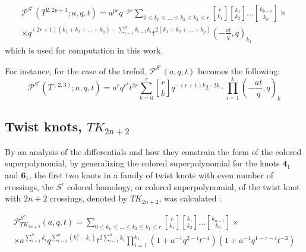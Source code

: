 \documentclass[a4paper,titlepage,twoside]{book}
\begin{document}
\begin{equation}
  \begin{gathered}
    \mathcal{P}^{ S^r}{ (T^{2,2p+1};a,q,t) } = a^{pr} q^{-pr} \sum_{ 0 \leq k_p \leq \dots \leq k_2 \leq k_1 \leq r} { r \brack k_1 } { k_1 \brack k_2 } \dots { k_{p-1} \brack k_p } \times \\
    \times q^{ (2r+1)( k_1 + k_2 + \dots + k_p )  - \sum_{i=1}^p k_{i-1} k_i } t^{ 2 (k_1 + k_2 + \dots + k_p ) } \left( -\frac{at}{q}, q \right)_{k_1}
\end{gathered} \label{Eq:analysisofdtorusknotPr01}
\end{equation}
which is used for computation in this work.  

For instance, for the case of the trefoil, $\mathcal{P}^{S^r}{(a,q,t)}$ becomes the following:
\begin{equation}
\mathcal{P}^{S^r}{ ( T^{(2,3)} ; a , q,t ) } = a^r q^{r^2} t^{2r} \sum_{k=0}^r { r \brack k } q^{ -(r+1)k } t^{-2k } \cdot \prod_{i=1}^k  \left( - \frac{at}{q} , q \right)_k \label{Eq:analysisofdifftrefoil} 
\end{equation}


\subsection{Twist knots, $TK_{2n+2}$}

By an analysis of the differentials and how they constrain the form of the colored superpolynomial, by generalizing the colored superpolynomial for the knots $\mathbf{4}_1$ and $\mathbf{6}_1$, the first two knots in a family of twist knots with even number of crossings, the $S^r$ colored homology, or colored superpolynomial, of the twist knot with $2n+2$ crossings, denoted by $TK_{2n+2}$, was calculated \cite{FujiGukovStosicSulkowski2013}:

\begin{equation}
\begin{gathered}
\mathcal{P}^{ S^r}_{TK_{2n+2} }{ (a,q,t)} = \sum_{ 0 \leq k_n \leq \dots \leq k_2 \leq k_1 \leq r} { r \brack k_1 } { k_1 \brack k_2 } \dots { k_{n-1} \brack k_n } \times \\
\times a^{ \sum_{i=1}^n k_i } q^{ \sum_{i=1}^n (k_i^2- k_i) } t^{ 2 \sum_{i=1}^n k_i } \prod_{i=1}^{k_1} (1 + a^{-1} q^{2-i } t^{-1} )(1 + a^{-1} q^{1-r-i} t^{-3} ) 
\end{gathered} \label{Eq:TwistKcoloredsuperpolynomial00}
\end{equation}
\end{document}
